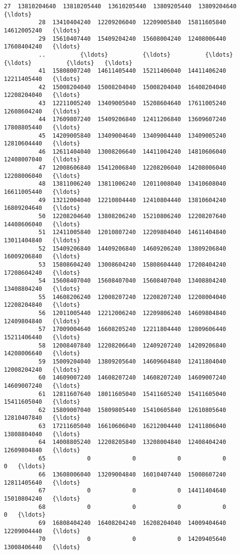 \documentclass[11pt]{article}
\begin{document}
\begin{Verbatim}[commandchars=\\\{\}]
          27  13810204640  13810205440  13610205440  13809205440  13809204640   {\ldots}      
          28  13410404240  12209206040  12209005840  15811605840  14612005240   {\ldots}      
          29  15610407440  15409204240  15608004240  12408006440  17608404240   {\ldots}      
          ..          {\ldots}          {\ldots}          {\ldots}          {\ldots}          {\ldots}   {\ldots}      
          41  15808007240  14611405440  15211406040  14411406240  12211405440   {\ldots}      
          42  15008204040  15008204040  15008204040  16408204040  12208204040   {\ldots}      
          43  12211005240  13409005040  15208604640  17611005240  12608604240   {\ldots}      
          44  17609807240  15409206840  12411206840  13609607240  17808805440   {\ldots}      
          45  14209005840  13409004640  13409004440  13409005240  12810604440   {\ldots}      
          46  12611404040  13008206640  14411004240  14810606040  12408007040   {\ldots}      
          47  12008606840  15412006840  12208206040  14208006040  12208006040   {\ldots}      
          48  13811006240  13811006240  12011008040  13410608040  16611005440   {\ldots}      
          49  13212004040  12210804440  12410804440  13810604240  16809204640   {\ldots}      
          50  12208204640  13808206240  15210806240  12208207640  14408606040   {\ldots}      
          51  12411005840  12010807240  12209804040  14611404840  13011404840   {\ldots}      
          52  15409206840  14409206840  14609206240  13809206840  16009206840   {\ldots}      
          53  15808604240  13008604240  15808604440  17208404240  17208604240   {\ldots}      
          54  15608407040  15608407040  15608407040  13408804240  13408804240   {\ldots}      
          55  14608206240  12008207240  12208207240  12208004040  12208204840   {\ldots}      
          56  12011005440  12212006240  12209806240  14609804840  12409804840   {\ldots}      
          57  17009004640  16608205240  12211804440  12809606440  15211406440   {\ldots}      
          58  12008407840  12208206640  12409207240  14209206840  14208006640   {\ldots}      
          59  15009204040  13809205640  14609604840  12411804040  12008204240   {\ldots}      
          60  14609007240  14608207240  14608207240  14609007240  14609007240   {\ldots}      
          61  12811607640  18011605040  15411605240  15411605040  15411605040   {\ldots}      
          62  15809007040  15809805440  15410605840  12610805640  12810407840   {\ldots}      
          63  17211605040  16610606040  16212004440  12411806040  13808804040   {\ldots}      
          64  14008805240  12208205840  13208004840  12408404240  12609804840   {\ldots}      
          65            0            0            0            0            0   {\ldots}      
          66  13608006040  13209004840  16010407440  15008607240  12811405640   {\ldots}      
          67            0            0            0  14411404640  15010804240   {\ldots}      
          68            0            0            0            0            0   {\ldots}      
          69  16808404240  16408204240  16208204040  14009404640  12209004440   {\ldots}      
          70            0            0            0  14209405640  13008406440   {\ldots}      
          

\end{Verbatim}
\end{document}
